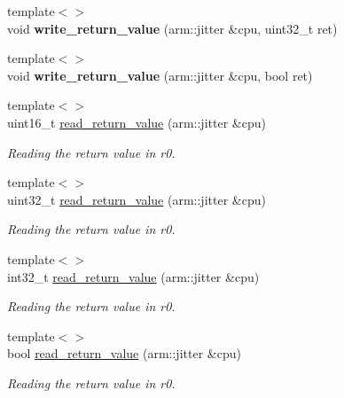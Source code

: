 \begin{DoxyCompactItemize}
\item 
\mbox{\label{namespaceeka2l1_1_1hle_a97c59e0201e87ad3f152aec275e70c22}} 
{\footnotesize template$<$$>$ }\\void {\bfseries write\+\_\+return\+\_\+value} (arm\+::jitter \&cpu, uint32\+\_\+t ret)
\item 
\mbox{\label{namespaceeka2l1_1_1hle_a57a148c71c147dd3e7a148852b161d1b}} 
{\footnotesize template$<$$>$ }\\void {\bfseries write\+\_\+return\+\_\+value} (arm\+::jitter \&cpu, bool ret)
\item 
{\footnotesize template$<$$>$ }\\uint16\+\_\+t \mbox{\hyperlink{namespaceeka2l1_1_1hle_a780d6d557ea10ebdc69e3e6cee88901b}{read\+\_\+return\+\_\+value}} (arm\+::jitter \&cpu)
\begin{DoxyCompactList}\small\item\em Reading the return value in r0. \end{DoxyCompactList}\item 
{\footnotesize template$<$$>$ }\\uint32\+\_\+t \mbox{\hyperlink{namespaceeka2l1_1_1hle_abddacbce52d394bce6e0b07d40fea31c}{read\+\_\+return\+\_\+value}} (arm\+::jitter \&cpu)
\begin{DoxyCompactList}\small\item\em Reading the return value in r0. \end{DoxyCompactList}\item 
{\footnotesize template$<$$>$ }\\int32\+\_\+t \mbox{\hyperlink{namespaceeka2l1_1_1hle_aa6a9bac062ed454de970279a2e54df31}{read\+\_\+return\+\_\+value}} (arm\+::jitter \&cpu)
\begin{DoxyCompactList}\small\item\em Reading the return value in r0. \end{DoxyCompactList}\item 
{\footnotesize template$<$$>$ }\\bool \mbox{\hyperlink{namespaceeka2l1_1_1hle_a1828abc8545af2551c544efc26c2a817}{read\+\_\+return\+\_\+value}} (arm\+::jitter \&cpu)
\begin{DoxyCompactList}\small\item\em Reading the return value in r0. \end{DoxyCompactList}\end{DoxyCompactItemize}
